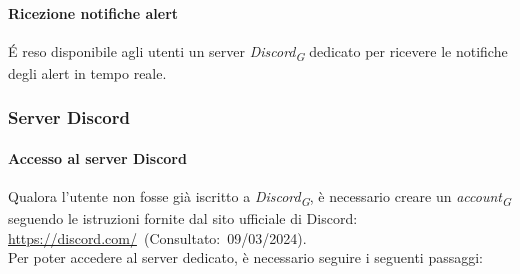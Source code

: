 \paragraph{Ricezione notifiche alert}
É reso disponibile agli utenti un server \textit{Discord}\textsubscript{\textit{G}} dedicato per ricevere le notifiche degli alert in tempo reale. \\


\subsubsection{Server Discord}

\paragraph{Accesso al server Discord}
Qualora l'utente non fosse già iscritto a \textit{Discord}\textsubscript{\textit{G}}, è necessario creare un \textit{account}\textsubscript{\textit{G}} seguendo le istruzioni fornite dal sito ufficiale di Discord: \url{https://discord.com/}~(Consultato:~09/03/2024). \\
Per poter accedere al server dedicato, è necessario seguire i seguenti passaggi:
